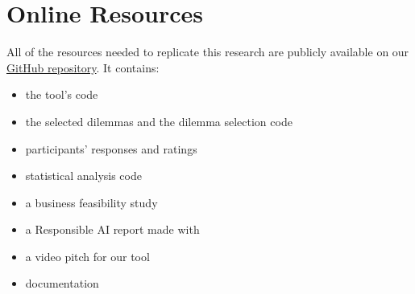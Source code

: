 \section{Online Resources}
\label{sec:resources}

All of the resources needed to replicate this research are publicly available on our
\href{https://github.com/emanuelemessina/broken-morals}{GitHub repository}.
It contains:
\begin{itemize}
  \item the tool's code
  \item the selected dilemmas and the dilemma selection code
  \item participants' responses and ratings
  \item statistical analysis code
  \item a business feasibility study
  \item a Responsible AI report made with \cite{constantinides2024raiguidelinesmethodgenerating}
  \item a video pitch for our tool
  \item documentation
\end{itemize}
